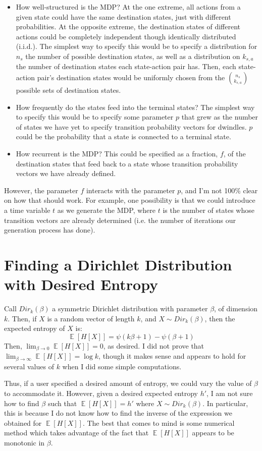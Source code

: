 \documentclass{article}
\DeclareMathOperator{\EX}{\mathbb{E}}
\begin{document}
\begin{itemize}
  \item How well-structured is the MDP? At the one extreme, all actions from a given state could have the same destination states, just with different probabilities. At the opposite extreme, the destination states of different actions could be completely independent though identically distributed (i.i.d.). The simplest way to specify this would be to specify a distribution for $n_s$ the number of possible destination states, as well as a distribution on $k_{s,a}$ the number of destination states each state-action pair has. Then, each state-action pair's destination states would be uniformly chosen from the $\binom{n_s}{k_{s,a}}$ possible sets of destination states.
  \item How frequently do the states feed into the terminal states? The simplest way to specify this would be to specify some parameter $p$ that grew as the number of states we have yet to specify transition probability vectors for dwindles. $p$ could be the probability that a state is connected to a terminal state.
  \item How recurrent is the MDP? This could be specified as a fraction, $f$, of the destination states that feed back to a state whose transition probability vectors we have already defined.
\end{itemize}
However, the parameter $f$ interacts with the parameter $p$, and I'm not 100\% clear on how that should work. For example, one possibility is that we could introduce a time variable $t$ as we generate the MDP, where $t$ is the number of states whose transition vectors are already determined (i.e. the number of iterations our generation process has done).

\section{Finding a Dirichlet Distribution with Desired Entropy}
Call $Dir_k(\beta)$ a symmetric Dirichlet distribution with parameter $\beta$, of dimension $k$. Then, if $X$ is a random vector of length $k$, and $X\sim Dir_k(\beta)$, then the expected entropy of $X$ is:
$$\EX[H[X]] = \psi(k\beta + 1) - \psi(\beta + 1)$$
Then, $\lim_{\beta\to0} \EX[H[X]] = 0$, as desired. I did not prove that $\lim_{\beta\to\infty} \EX[H[X]] = \log k$, though it makes sense and appears to hold for several values of $k$ when I did some simple computations.

Thus, if a user specified a desired amount of entropy, we could vary the value of $\beta$ to accommodate it. However, given a desired expected entropy $h'$, I am not sure how to find $\beta$ such that $\EX[H[X]] = h'$ where $X\sim Dir_k(\beta)$. In particular, this is because I do not know how to find the inverse of the expression we obtained for $\EX[H[X]]$. The best that comes to mind is some numerical method which takes advantage of the fact that $\EX[H[X]]$ appears to be monotonic in $\beta$.
\end{document}
